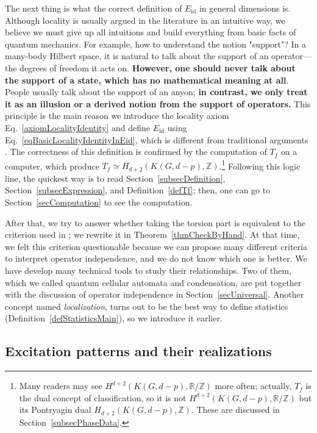 \documentclass[reprint, amsmath, amssymb, showpacs, floatfix, longbibliography, aps, twocolumn, superscriptaddress, nofootinbib]{revtex4-2}
\newcommand{\ZZ}{{\mathbb Z}}
\newcommand{\RR}{{\mathbb R}}
\newcommand{\id}{{\operatorname{id}}}
\theoremstyle{definition}
\begin{document}
The next thing is what the correct definition of $E_\id$ in general dimensions is. Although locality is usually argued in the literature in an intuitive way, we believe we must give up all intuitions and build everything from basic facts of quantum mechanics. For example, how to understand the notion "support"? In a many-body Hilbert space, it is natural to talk about the support of an operator---the degrees of freedom it acts on. \textbf{However, one should never talk about the support of a state, which has no mathematical meaning at all}. People usually talk about the support of an anyon; \textbf{in contrast, we only treat it as an illusion or a derived notion from the support of operators.} This principle is the main reason we introduce the locality axiom Eq.~\eqref{axiomLocalityIdentity} and define $E_\id$ using Eq.~\eqref{eqBasicLocalityIdentityInEid}, which is different from traditional arguments \cite{FHH21,Previous}. The correctness of this definition is confirmed by the computation of $T_f$ on a computer, which produce $T_f\simeq H_{d+2}(K(G,d-p),\ZZ)$.\footnote{ Many readers may see $H^{d+2}(K(G,d-p),\RR/\ZZ)$ more often; actually, $T_f$ is the dual concept of classification, so it is not $H^{d+2}(K(G,d-p),\RR/\ZZ)$ but its Pontryagin dual $H_{d+2}(K(G,d-p),\ZZ)$. These are discussed in Section~\ref{subsecPhaseData}. } Following this logic line, the quickest way is to read Section~\ref{subsecDefinition}, Section~\ref{subsecExpression}, and Definition~\ref{defTf}; then, one can go to Section~\ref{secComputation} to see the computation. 

After that, we try to answer whether taking the torsion part is equivalent to the criterion used in \cite{FHH21}; we rewrite it in Theorem~\ref{thmCheckByHand}. At that time, we felt this criterion questionable because we can propose many different criteria to interpret operator independence, and we do not know which one is better. We have develop many technical tools to study their relationships. Two of them, which we called quantum cellular automata and condensation, are put together with the discussion of operator independence in Section~\ref{secUniversal}. Another concept named \textit{localization}, turns out to be the best way to define statistics (Definition~\ref{defStatisticsMain}), so we introduce it earlier.


\subsection{Excitation patterns and their realizations}\label{subsecModel}
\end{document}
